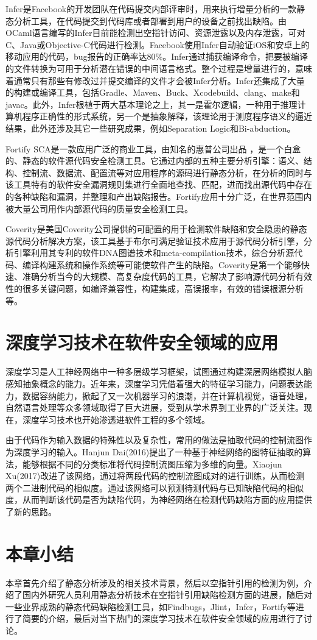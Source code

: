 Infer是Facebook的开发团队在代码提交内部评审时，用来执行增量分析的一款静态分析工具，在代码提交到代码库或者部署到用户的设备之前找出缺陷。由OCaml语言编写的Infer目前能检测出空指针访问、资源泄露以及内存泄露，可对C、Java或Objective-C代码进行检测。Facebook使用Infer自动验证iOS和安卓上的移动应用的代码，bug报告的正确率达80\%。Infer通过捕获编译命令，把要被编译的文件转换为可用于分析潜在错误的中间语言格式。整个过程是增量进行的，意味着通常只有那些有修改过并提交编译的文件才会被Infer分析。Infer还集成了大量的构建或编译工具，包括Gradle、Maven、Buck、Xcodebuild、clang、make和javac。此外，Infer根植于两大基本理论之上，其一是霍尔逻辑，一种用于推理计算机程序正确性的形式系统，另一个是抽象解释，该理论用于测度程序语义的逼近结果，此外还涉及其它一些研究成果，例如Separation Logic和Bi-abduction。

Fortify SCA是一款应用广泛的商业工具，由知名的惠普公司出品 ，是一个白盒的、静态的软件源代码安全检测工具。它通过内部的五种主要分析引擎：语义、结构、控制流、数据流、配置流等对应用程序的源码进行静态分析，在分析的同时与该工具特有的软件安全漏洞规则集进行全面地查找、匹配，进而找出源代码中存在的各种缺陷和漏洞，并整理和产出缺陷报告。Fortify应用十分广泛，在世界范围内被大量公司用作内部源代码的质量安全检测工具。

Coverity是美国Coverity公司提供的可配置的用于检测软件缺陷和安全隐患的静态源代码分析解决方案，该工具基于布尔可满足验证技术应用于源代码分析引擎，分析引擎利用其专利的软件DNA图谱技术和meta-compilation技术，综合分析源代码、编译构建系统和操作系统等可能使软件产生的缺陷。Coverity是第一个能够快速、准确分析当今的大规模、高复杂度代码的工具，它解决了影响源代码分析有效性的很多关键问题，如编译兼容性，构建集成，高误报率，有效的错误根源分析等。

\section{深度学习技术在软件安全领域的应用}
深度学习是人工神经网络中一种多层级学习框架，试图通过构建深层网络模拟人脑感知抽象概念的能力。近年来，深度学习凭借着强大的特征学习能力，问题表达能力，数据容纳能力，掀起了又一次机器学习的浪潮，并在计算机视觉，语音处理，自然语言处理等众多领域取得了巨大进展，受到从学术界到工业界的广泛关注。现在，深度学习技术也开始渗透进软件工程的多个领域。

由于代码作为输入数据的特殊性以及复杂性，常用的做法是抽取代码的控制流图作为深度学习的输入。Hanjun Dai(2016)提出了一种基于神经网络的图特征抽取的算法，能够根据不同的分类标准将代码控制流图压缩为多维的向量。Xiaojun Xu(2017)改进了该网络，通过将两段代码的控制流图成对的进行训练，从而检测两个二进制代码的相似度。通过该网络可以预测待测代码与已知缺陷代码的相似度，从而判断该代码是否为缺陷代码，为神经网络在检测代码缺陷方面的应用提供了新的思路。


\section{本章小结}
本章首先介绍了静态分析涉及的相关技术背景，然后以空指针引用的检测为例，介绍了国内外研究人员利用静态分析技术在空指针引用缺陷检测方面的进展，随后对一些业界成熟的静态代码缺陷检测工具，如Findbugs，Jlint，Infer，Fortify等进行了简要的介绍，最后对当下热门的深度学习技术在软件安全领域的应用进行了讨论。